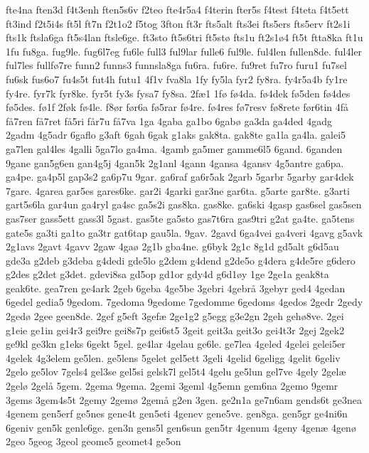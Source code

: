 {fte4na
ften3d
f4t3enh
ften5s6v
f2teo
fte4r5a4
f4terin
fter5s
f4test
f4teta
f4t5ett
ft3ind
f2t5i4s
ft5l
ft7n
f2t1o2
f5tog
3fton
ft3r
fts5alt
fts3ei
fts5ers
fts5erv
ft2s1i
fts1k
ftsla6ga
ft5s4lan
ftsle6ge.
ft3sto
ft5s6tri
ft5st^^f8
fts1u
ft2s1^^f84
ft5t
ftta8ka
ft1u
1fu
fu8ga.
fug9le.
fug6l7eg
fu6le
full3
ful9lar
fulle6
ful9le.
ful4len
fullen8de.
ful4ler
ful7les
fullf^^f87re
funn2
funns3
funnsla8ga
fu6ra.
fu6re.
fu9ret
fu7ro
furu1
fu7sel
fu6sk
fus6o7
fu4s5t
fut4h
futu1
4f1v
fva8la
1fy
fy5la
fyr2
fy8ra.
fy4r5a4b
fy1re
fy4re.
fyr7k
fyr8ke.
fyr5t
fy3s
fysa7
fy8sa.
2f^^e61
1f^^f8
f^^f84da.
f^^f84dek
f^^f85den
f^^f84des
f^^f85des.
f^^f81f
2f^^f8k
f^^f84le.
f8^^f8r
f^^f8r6a
f^^f85rar
f^^f84re.
f^^f84res
f^^f87resv
f^^f88rete
f^^f8r6tin
4f^^e5
f^^e57ren
f^^e57ret
f^^e55ri
f^^e5r7u
f^^e57va
1ga
4gaba
ga1bo
6gab^^f8
ga3da
ga4ded
4gadg
2gadm
4g5adr
6gaflo
g3aft
6gah
6gak
g1aks
gak8ta.
gak8te
ga1la
ga4la.
galei5
ga7len
gal4les
4galli
5ga7lo
ga4ma.
4gamb
ga5mer
gamme6l5
6gand.
6ganden
9gane
gan5g6en
gan4g5j
4gan5k
2g1anl
4gann
4gansa
4gansv
4g5antre
ga6pa.
ga4pe.
ga4p5l
gap3s2
ga6p7u
9gar.
ga6raf
ga6r5ak
2garb
5garbr
5garby
gar4dek
7gare.
4garea
gar5es
gares6ke.
gar2i
4garki
gar3ne
gar6ta.
g5arte
gar8te.
g3arti
gart5s6la
gar4un
ga4ryl
ga4sc
ga5s2i
gas8ka.
gas8ke.
ga6ski
4gasp
gas6sel
gas5sen
gas7ser
gass5ett
gass3l
5gast.
gas5te
ga5sto
gas7t6ra
gas9tri
g2at
ga4te.
ga5tens
gate5s
ga3ti
ga1to
ga3tr
gat6tap
gau5la.
9gav.
2gavd
6ga4vei
ga4veri
4gavg
g5avk
2g1avs
2gavt
4gavv
2gaw
4ga^^f8
2g1b
gba4ne.
g6byk
2g1c
8g1d
gd5alt
g6d5au
gde3a
g2deb
g3deba
g4dedi
gde5lo
g2dem
g4dend
g2de5o
g4dera
g4de5re
g6dero
g2des
g2det
g3det.
gdevi8sa
gd5op
gd1or
gdy4d
g6d1^^f8y
1ge
2ge1a
geak8ta
geak6te.
gea7ren
ge4ark
2geb
6geba
4ge5be
3gebri
4gebr^^e5
3gebyr
ged4
4gedan
6gedel
gedia5
9gedom.
7gedoma
9gedome
7gedomme
6gedoms
4gedos
2gedr
2gedy
2ged^^f8
2gee
geen8de.
2gef
g5eft
3gef^^e6
2ge1g2
g5egg
g3e2gn
2geh
geh^^f88ve.
2gei
g1eie
ge1in
gei4r3
gei9re
gei8s7p
gei6st5
3geit
geit3a
geit3o
gei4t3r
2gej
2gek2
ge9kl
ge3kn
g1eks
6gekt
5gel.
ge4lar
4gelau
ge6le.
ge7lea
4geled
4gelei
gelei5er
4gelek
4g3elem
ge5len.
ge5lens
5gelet
gel5ett
3geli
4gelid
6geligg
4gelit
6geliv
2gelo
ge5lov
7gels4
gel3se
gel5si
gelsk7l
gel5t4
4gelu
ge5lun
gel7ve
4gely
2gel^^e6
2gel^^f8
2gel^^e5
5gem.
2gema
9gema.
2gemi
3geml
4g5emn
gem6na
2gemo
9gemr
3gems
3gem4s5t
2gemy
2gem^^f8
2gem^^e5
g2en
3gen.
ge2n1a
ge7n6am
gends6t
ge3nea
4genem
gen5erf
ge5nes
gene4t
gen5eti
4genev
gene5ve.
gen8ga.
gen5gr
ge4ni6n
6geniv
gen5k
genle6ge.
gen3n
gens5l
gen6sun
gen5tr
4genum
4geny
4gen^^e6
4gen^^f8
2geo
5geog
3geol
geome5
geomet4
ge5on
}
